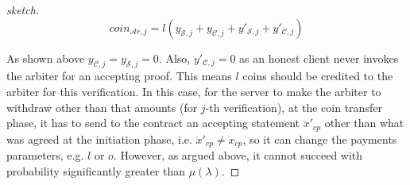 \begin{proof}[sketch]
     
     \begin{equation}\label{equ::arbiter}
    coin_{\scriptscriptstyle\mathcal{A}r,j}= l(y_{\scriptscriptstyle\mathcal {S},j}+y_{\scriptscriptstyle\mathcal {C},j}+y'_{\scriptscriptstyle\mathcal {S},j}+y'_{\scriptscriptstyle\mathcal {C},j})
     \end{equation}

As shown above $y_{\scriptscriptstyle\mathcal{C},j}=y_{\scriptscriptstyle\mathcal{S},j}=0$. Also, $y'_{\scriptscriptstyle\mathcal{C},j}=0$ as an honest client never invokes the arbiter for an accepting proof. This means $l$ coins should be credited to the arbiter for this verification.  In this case, for the server to make the arbiter to withdraw other than that amounts (for $j$-th verification), at the coin transfer phase, it has to send to the contract  an accepting  statement $\ddot{x}'_{\scriptscriptstyle cp}$ other than what was agreed at the initiation phase, i.e. $\ddot{x}'_{\scriptscriptstyle cp}\neq\ddot{x}_{\scriptscriptstyle cp}$, so it can change the payments parameters, e.g. $l$ or $o$. However, as argued above, it cannot succeed with probability significantly greater than $\mu(\lambda)$.





\end{proof}
